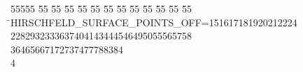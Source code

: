%
%
\begin{tabbing}
55555 \= 55 \= 55 \= 55 \= 55 \= 55 \= 55 \= 55 \= 55 \= 55 \= 55 \= 55 \= 55 \= \>HIRSCHFELD\_SURFACE\_POINTS\_OFF=151617181920212224\\[0pt]
2282932333637404143444546495055565758\\[0pt]
36465667172737477788384\\[0pt]
4\>\end{tabbing}

